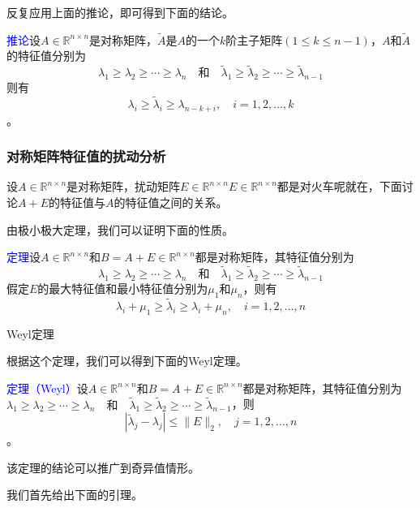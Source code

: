 \documentclass[12pt,a4paper]{article}
\begin{document}
反复应用上面的推论，即可得到下面的结论。

\textcolor{blue}{推论}\quad 设$A \in \mathbb{R}^{n \times n}$是对称矩阵，$\tilde{A}$是$A$的一个$k$阶主子矩阵$(1 \leq k \leq n-1)$，$A$和$\tilde{A}$的特征值分别为$$
\lambda_{1} \geq \lambda_{2} \geq \cdots \geq \lambda_{n} \quad \text{和}  \quad \tilde{\lambda}_{1} \geq \tilde{\lambda}_{2} \geq \cdots \geq \tilde{\lambda}_{n-1}
$$则有$$
\lambda_{i} \geq \tilde{\lambda}_{i} \geq \lambda_{n-k+i}, \quad i=1,2, \ldots, k
$$。
\subsubsection{对称矩阵特征值的扰动分析}
设$A \in \mathbb{R}^{n \times n}$是对称矩阵，扰动矩阵$E \in \mathbb{R}^{n \times n}$$E \in \mathbb{R}^{n \times n}$都是对火车呢就在，下面讨论$A+E$的特征值与$A$的特征值之间的关系。

由极小极大定理，我们可以证明下面的性质。

\textcolor{blue}{定理}\quad 设$A \in \mathbb{R}^{n \times n}$和$B=A+E \in \mathbb{R}^{n \times n}$都是对称矩阵，其特征值分别为$$
\lambda_{1} \geq \lambda_{2} \geq \cdots \geq \lambda_{n} \quad \text{和}  \quad \tilde{\lambda}_{1} \geq \tilde{\lambda}_{2} \geq \cdots \geq \tilde{\lambda}_{n-1}
$$假定$E$的最大特征值和最小特征值分别为$\mu_{1}$和$\mu_{n}$，则有$$
\lambda_{i}+\mu_{1} \geq \tilde{\lambda}_{i} \geq \lambda_{i}+\mu_{n}, \quad i=1,2, \ldots, n
$$

Weyl定理

根据这个定理，我们可以得到下面的Weyl定理。

\textcolor{blue}{定理（Weyl）}\quad 设$A \in \mathbb{R}^{n \times n}$和$B=A+E \in \mathbb{R}^{n \times n}$都是对称矩阵，其特征值分别为$
\lambda_{1} \geq \lambda_{2} \geq \cdots \geq \lambda_{n} \quad \text{和}  \quad \tilde{\lambda}_{1} \geq \tilde{\lambda}_{2} \geq \cdots \geq \tilde{\lambda}_{n-1}
$，则$$
\left|\tilde{\lambda}_{j}-\lambda_{j}\right| \leq\|E\|_{2}, \quad j=1,2, \ldots, n
$$。

该定理的结论可以推广到奇异值情形。

我们首先给出下面的引理。
\end{document}
